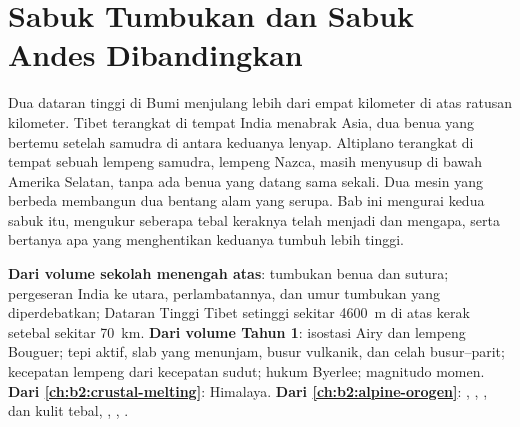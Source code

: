 \chapter{Sabuk Tumbukan dan Sabuk Andes Dibandingkan}\label{ch:b2:himalaya-andes}

Dua dataran tinggi di Bumi menjulang lebih dari empat kilometer di atas ratusan kilometer.
Tibet terangkat di tempat India menabrak Asia, dua benua yang bertemu setelah samudra di antara
keduanya lenyap. Altiplano terangkat di tempat sebuah lempeng samudra, lempeng Nazca, masih menyusup
di bawah Amerika Selatan, tanpa ada benua yang datang sama sekali. Dua mesin yang berbeda membangun dua
bentang alam yang serupa. Bab ini mengurai kedua sabuk itu, mengukur seberapa tebal keraknya
telah menjadi dan mengapa, serta bertanya apa yang menghentikan keduanya tumbuh lebih tinggi.

\begin{recall}
\textbf{Dari volume sekolah menengah atas}: tumbukan benua dan sutura; pergeseran India
ke utara, perlambatannya, dan umur tumbukan yang diperdebatkan; Dataran Tinggi Tibet setinggi sekitar
\qty{4600}{m} di atas kerak setebal sekitar \qty{70}{km}. \textbf{Dari volume Tahun 1}:
isostasi Airy dan lempeng Bouguer; tepi aktif, slab yang menunjam, busur vulkanik, dan
celah busur--parit; kecepatan lempeng dari kecepatan sudut; hukum Byerlee; magnitudo
momen. \textbf{Dari \cref{ch:b2:crustal-melting}}:  Himalaya.
\textbf{Dari \cref{ch:b2:alpine-orogen}}: , , ,  dan
kulit tebal, , , .
\end{recall}

